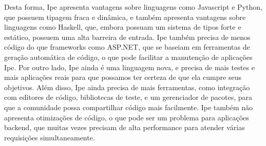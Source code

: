 \documentclass[12pt]{article}
\begin{document}
Desta forma, Ipe apresenta vantagens sobre linguagens como Javascript e Python, que possuem tipagem
fraca e dinâmica, e também apresenta vantagens sobre linguagens como Haskell, que, embora possuam um
sistema de tipos forte e estático, possuem uma alta barreira de entrada. Ipe também precisa de menos código do que frameworks
como ASP.NET, que se baseiam em ferramentas de geração automática de código, o que pode facilitar a
manutenção de aplicações Ipe. Por outro lado, Ipe ainda é uma linguagem nova, e precisa de mais
testes e mais aplicações reais para que possamos ter certeza de que ela cumpre seus objetivos. Além
disso, Ipe ainda precisa de mais ferramentas, como integração com editores de código, bibliotecas de
teste, e um gerenciador de pacotes, para que a comunidade possa compartilhar código mais facilmente.
Ipe também não apresenta otimizações de código, o que pode ser um problema para aplicações backend,
que muitas vezes precisam de alta performance para atender várias requisições simultaneamente.




\end{document}
